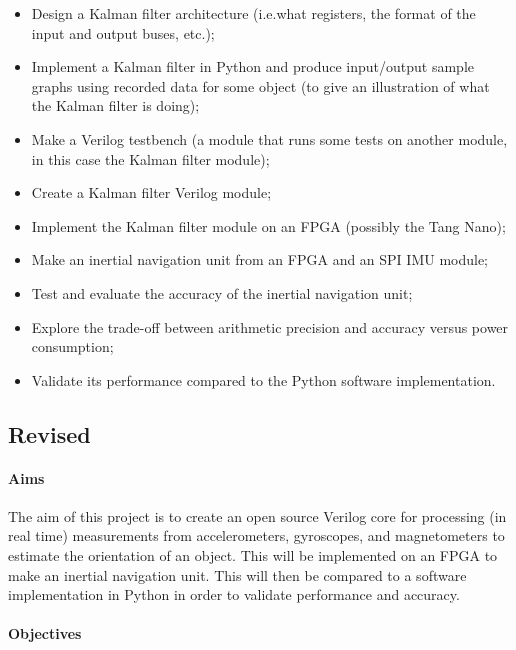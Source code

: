 \documentclass[12pt]{article}
\begin{document}
\begin{itemize}[noitemsep]
	\item Design a Kalman filter architecture (i.e.\@ what registers, the format of the input and output buses, etc.);
	\item Implement a Kalman filter in Python and produce input/output sample graphs using recorded data for some object (to give an illustration of what the Kalman filter is doing);
	\item Make a Verilog testbench (a module that runs some tests on another module, in this case the Kalman filter module);
	\item Create a Kalman filter Verilog module;
	\item Implement the Kalman filter module on an FPGA (possibly the Tang Nano);
	\item Make an inertial navigation unit from an FPGA and an SPI IMU module;
	\item Test and evaluate the accuracy of the inertial navigation unit;
	\item Explore the trade-off between arithmetic precision and accuracy versus power consumption;
	\item Validate its performance compared to the Python software implementation.
\end{itemize}

\subsection*{Revised}

\paragraph{Aims}

The aim of this project is to create an open source Verilog core for processing (in real time) measurements from accelerometers, gyroscopes, and magnetometers to estimate the orientation of an object. This will be implemented on an FPGA to make an inertial navigation unit. This will then be compared to a software implementation in Python in order to validate performance and accuracy.

\paragraph{Objectives}
\end{document}
